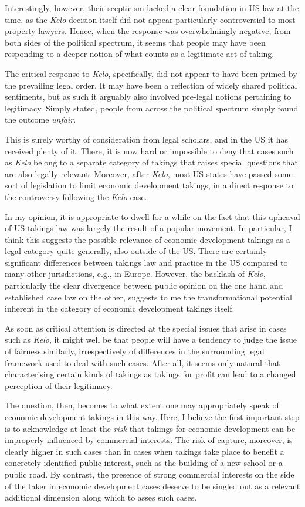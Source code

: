 \documentclass{article} %
\begin{document}
Interestingly, however, their scepticism lacked a clear foundation in US law at the time, as the {\it Kelo} decision itself did not appear particularly controversial to most property lawyers. Hence, when the response was overwhelmingly negative, from both sides of the political spectrum, it seems that people may have been responding to a deeper notion of what counts as a legitimate act of taking.

The critical response to {\it Kelo}, specifically, did not appear to have been primed by the prevailing legal order. It may have been a reflection of widely shared political sentiments, but as such it arguably also involved pre-legal notions pertaining to legitimacy. Simply stated, people from across the political spectrum simply found the outcome {\it unfair}.

This is surely worthy of consideration from legal scholars, and in the US it has received plenty of it. There, it is now hard or impossible to deny that cases such as {\it Kelo} belong to a separate category of takings that raises special questions that are also legally relevant. Moreover, after {\it Kelo}, most US states have passed some sort of legislation to limit economic development takings, in a direct response to the controversy following the {\it Kelo} case. 

In my opinion, it is appropriate to dwell for a while on the fact that this upheaval of US takings law was largely the result of a popular movement. In particular, I think this suggests the possible relevance of economic development takings as a legal category quite generally, also outside of the US. There are certainly significant differences between takings law and practice in the US compared to many other jurisdictions, e.g., in Europe. However, the backlash of {\it Kelo}, particularly the clear divergence between public opinion on the one hand and established case law on the other, suggests to me the transformational potential inherent in the category of economic development takings itself.

As soon as critical attention is directed at the special issues that arise in cases such as {\it Kelo}, it might well be that people will have a tendency to judge the issue of fairness similarly, irrespectively of differences in the surrounding legal framework used to deal with such cases. After all, it seems only natural that characterising certain kinds of takings as takings for profit can lead to a changed perception of their legitimacy.

The question, then, becomes to what extent one may appropriately speak of economic development takings in this way. Here, I believe the first important step is to acknowledge at least the {\it risk} that takings for economic development can be improperly influenced by commercial interests. The risk of capture, moreover, is clearly higher in such cases than in cases when takings take place to benefit a concretely identified public interest, such as the building of a new school or a public road. By contrast, the presence of strong commercial interests on the side of the taker in economic development cases deserve to be singled out as a relevant additional dimension along which to asses such cases.
\end{document}
